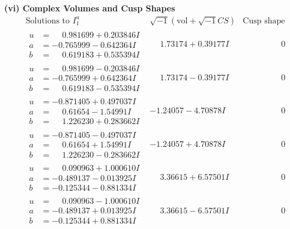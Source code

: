 \documentclass[1p]{elsarticle_modified}
\theoremstyle{definition}
\newcommand{\I}{\sqrt{-1}}
\begin{document}
\newpage\flushleft \textbf{(vi) Complex Volumes and Cusp Shapes}
$$\begin{array}{c|c|c}  
\text{Solutions to }I^u_{1}& \I (\text{vol} + \sqrt{-1}CS) & \text{Cusp shape}\\
 \hline 
\begin{aligned}
u &= \phantom{-}0.981699 + 0.203846 I \\
a &= -0.765999 - 0.642364 I \\
b &= \phantom{-}0.619183 + 0.535394 I\end{aligned}
 & \phantom{-}1.73174 + 0.39177 I & \phantom{-0.000000 } 0 \\ \hline\begin{aligned}
u &= \phantom{-}0.981699 - 0.203846 I \\
a &= -0.765999 + 0.642364 I \\
b &= \phantom{-}0.619183 - 0.535394 I\end{aligned}
 & \phantom{-}1.73174 - 0.39177 I & \phantom{-0.000000 } 0 \\ \hline\begin{aligned}
u &= -0.871405 + 0.497037 I \\
a &= \phantom{-}0.61654 - 1.54991 I \\
b &= \phantom{-}1.226230 + 0.283662 I\end{aligned}
 & -1.24057 - 4.70878 I & \phantom{-0.000000 } 0 \\ \hline\begin{aligned}
u &= -0.871405 - 0.497037 I \\
a &= \phantom{-}0.61654 + 1.54991 I \\
b &= \phantom{-}1.226230 - 0.283662 I\end{aligned}
 & -1.24057 + 4.70878 I & \phantom{-0.000000 } 0 \\ \hline\begin{aligned}
u &= \phantom{-}0.090963 + 1.000610 I \\
a &= -0.489137 - 0.013925 I \\
b &= -0.125344 - 0.881334 I\end{aligned}
 & \phantom{-}3.36615 + 6.57501 I & \phantom{-0.000000 } 0 \\ \hline\begin{aligned}
u &= \phantom{-}0.090963 - 1.000610 I \\
a &= -0.489137 + 0.013925 I \\
b &= -0.125344 + 0.881334 I\end{aligned}
 & \phantom{-}3.36615 - 6.57501 I & \phantom{-0.000000 } 0 \\ \hline\begin{aligned}

\end{aligned}
\end{array}$$
\end{document}
